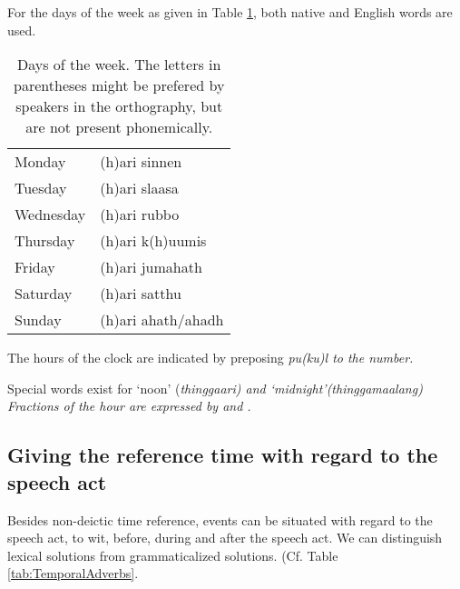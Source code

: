 


For the days of the week as given in Table \ref{tab:DaysOfTheWeek}, both native and English words are used.

\begin{table}
\centering
 \begin{tabular}{ll}
Monday & (h)ari sinnen\\
Tuesday&(h)ari slaasa\\
Wednesday& (h)ari rubbo \\
Thursday& (h)ari k(h)uumis \\
Friday&(h)ari jumahath \\
Saturday&(h)ari satthu \\
Sunday&(h)ari ahath/ahadh \\
 \end{tabular}
 \caption[Days of the week]{Days of the week. The letters in parentheses might be prefered by speakers in the orthography, but are not present phonemically.}
 \label{tab:DaysOfTheWeek}
\end{table}


The hours of the clock are indicated by preposing \em pu(ku)l \em to the number.


Special words exist for `noon' (\em thinggaari\em) and `midnight'(\em thinggamaalang\em)
Fractions of the hour are expressed by  and .

\subsection{Giving the reference time with regard to the speech act}\label{sec:func:Givingthereferencetimewithregardtothespeechact}
Besides non-deictic time reference, events can be situated with regard to the speech act, to wit, before, during and after the speech act.
We can distinguish lexical solutions  from grammaticalized solutions.  (Cf. Table \ref{tab:TemporalAdverbs}.

